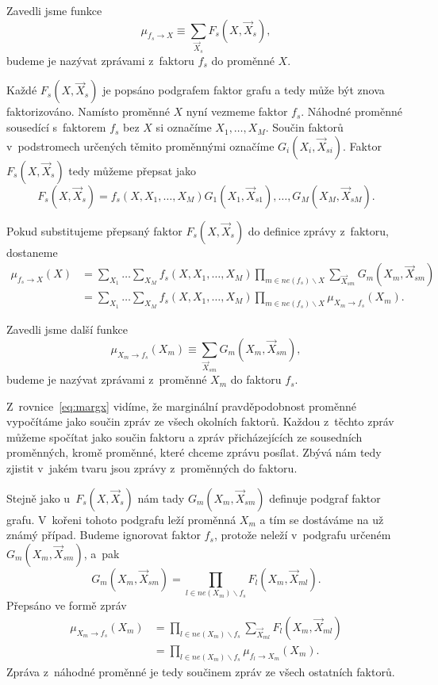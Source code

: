Zavedli jsme funkce
\begin{equation}
    \mu_{f_s \rightarrow X} \equiv \sum_{\vec{X}_s} F_s(X, \vec{X}_s),
\label{eq:defmsgfx}
\end{equation}
budeme je nazývat zprávami z~faktoru $f_s$ do proměnné $X$.

Každé $F_s(X, \vec{X}_s)$ je popsáno podgrafem faktor grafu a tedy může být znova faktorizováno.
Namísto proměnné $X$ nyní vezmeme faktor $f_s$.
Náhodné proměnné sousedící s~faktorem $f_s$ bez $X$ si označíme $X_1, \dots, X_M$.
Součin faktorů v~podstromech určených těmito proměnnými označíme $G_i(X_i, \vec{X}_{si})$.
Faktor $F_s(X, \vec{X}_s)$ tedy můžeme přepsat jako
\begin{equation}
F_s(X, \vec{X}_s) = f_s(X, X_1, \dots, X_M) G_1(X_1, \vec{X}_{s1}), \dots, G_M(X_M, \vec{X}_{sM}).
\end{equation}

Pokud substitujeme přepsaný faktor $F_s(X, \vec{X}_s)$ do definice zprávy z~faktoru, dostaneme
\begin{align}
\mu_{f_s \rightarrow X}(X) &=
    \sum_{X_1} \dots \sum_{X_M}
        f_s(X, X_1, \dots, X_M)
        \prod_{m \in ne(f_s) \backslash X}
            \sum_{\vec{X}_{sm}}
                G_m(X_m, \vec{X}_{sm})
\\
&= \sum_{X_1} \dots \sum_{X_M}
    f_s(X, X_1, \dots, X_M)
    \prod_{m \in ne(f_s) \backslash X}
        \mu_{X_m \rightarrow f_s}(X_m).
\label{eq:mfsx}
\end{align}

Zavedli jsme další funkce 
\begin{equation}
    \mu_{X_m \rightarrow f_s}(X_m) \equiv \sum_{\vec{X}_{sm}} G_m(X_m, \vec{X}_{sm}),
\label{eq:defmsgxf}
\end{equation}
budeme je nazývat zprávami z~proměnné $X_m$ do faktoru $f_s$.

Z~rovnice~\ref{eq:margx} vidíme, že marginální pravděpodobnost proměnné vypočítáme jako součin zpráv ze všech okolních faktorů.
Každou z~těchto zpráv můžeme spočítat jako součin faktoru a zpráv přicházejících ze sousedních proměnných, kromě proměnné, které chceme zprávu posílat. Zbývá nám tedy zjistit v~jakém tvaru jsou zprávy z~proměnných do faktoru.

Stejně jako u~$F_s(X, \vec{X}_s)$ nám tady $G_m(X_m, \vec{X}_{sm})$ definuje podgraf faktor grafu. 
V~kořeni tohoto podgrafu leží proměnná $X_m$ a tím se dostáváme na už známý případ.
Budeme ignorovat faktor $f_s$, protože neleží v~podgrafu určeném $G_m(X_m, \vec{X}_{sm})$, a~pak 
\begin{equation}
    G_m(X_m, \vec{X}_{sm}) = \prod_{l \in ne(X_m) \backslash f_s} F_l(X_m, \vec{X}_{ml}).
\end{equation}
Přepsáno ve formě zpráv
\begin{align}
\mu_{X_m \rightarrow f_s}(X_m)
&= \prod_{l \in ne(X_m) \backslash f_s}
    \sum_{\vec{X}_{ml}}
        F_l(X_m, \vec{X}_{ml})
\\
&= \prod_{l \in ne(X_m) \backslash f_s}
    \mu_{f_l \rightarrow X_m}(X_m).
\end{align}
Zpráva z~náhodné proměnné je tedy součinem zpráv ze všech ostatních faktorů.

